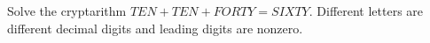 Solve the cryptarithm $ TEN+TEN+FORTY=SIXTY $. Different letters are different decimal digits and leading digits are nonzero.
